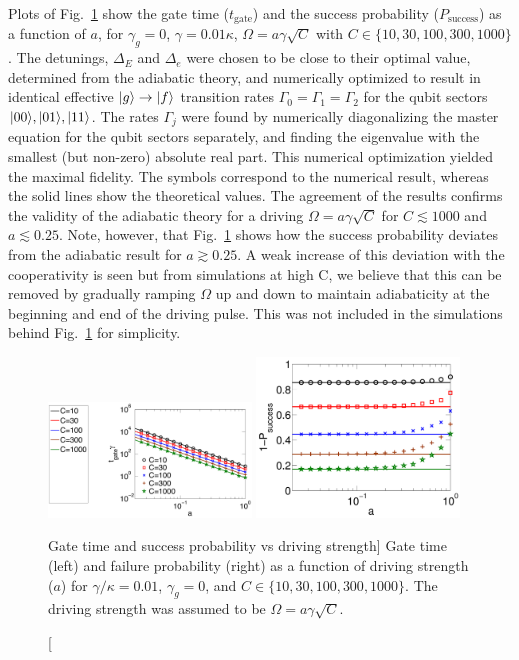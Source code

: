 Plots of Fig.~\ref{fig:t_gate,P_success} show the gate time ($t_{\text{gate}}$)
and the success probability ($P_{\text{success}}$) as a function of $a$, for
$\gamma_g = 0$, $\gamma = 0.01\kappa$, $\Omega=a\gamma\sqrt{C}$ with
$C\in\{10,30,100,300,1000\}$. The detunings, $\Delta_E$ and $\Delta_e$ were
chosen to be close to their optimal value, determined from the adiabatic theory,
and numerically optimized to result in identical effective $| g \rangle\rightarrow
| f \rangle$ transition rates  $\Gamma_0 = \Gamma_1 = \Gamma_2$ for the qubit
sectors $| 00 \rangle, | 01 \rangle, | 11 \rangle$. The rates $\Gamma_j$ were found by
numerically diagonalizing the master equation for the qubit sectors separately,
and finding the eigenvalue with the smallest (but non-zero) absolute real part.
This numerical optimization yielded the maximal fidelity. The symbols correspond
to the numerical result, whereas the solid lines show the theoretical values.
The agreement of the results confirms the validity of the adiabatic theory for a
driving $\Omega=a\gamma\sqrt{C}$ for $C\lesssim 1000$ and $a\lesssim0.25$. Note,
however, that Fig.~\ref{fig:t_gate,P_success} shows how the success probability
deviates from the adiabatic result for $a\gtrsim0.25$. A weak increase of this
deviation with the cooperativity is seen but from simulations at high C, we
believe that this can be removed by gradually ramping $\Omega$ up and down to
maintain adiabaticity at the beginning and end of the driving pulse. This was
not included in the simulations behind Fig.~\ref{fig:t_gate,P_success} for
simplicity.
 \begin{figure}[h]
\centering
\includegraphics[width=0.48\textwidth]{./figs_Borregaard_PRL2015/figureSN1}\quad 
\includegraphics[width=0.48\textwidth]{./figs_Borregaard_PRL2015/figureSN2}
\caption
[Gate time and success probability vs driving strength]
{
\label{fig:t_gate,P_success}
Gate time (left) and failure probability (right) as a function of driving
strength ($a$) for $\gamma/\kappa = 0.01$, $\gamma_g = 0$, and
$C\in\{10,30,100,300,1000\}$. The driving strength was assumed to be
$\Omega=a\gamma\sqrt{C}$.}
\end{figure} 
 

